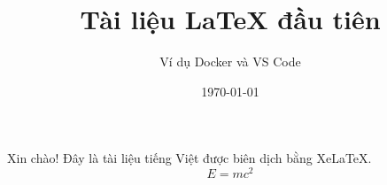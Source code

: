 \documentclass{article}
\title{Tài liệu LaTeX đầu tiên}
\author{Ví dụ Docker và VS Code}
\date{\today}
\begin{document}
\maketitle
Xin chào! Đây là tài liệu tiếng Việt được biên dịch bằng XeLaTeX.
\[
  E = mc^2
\]
\end{document}
